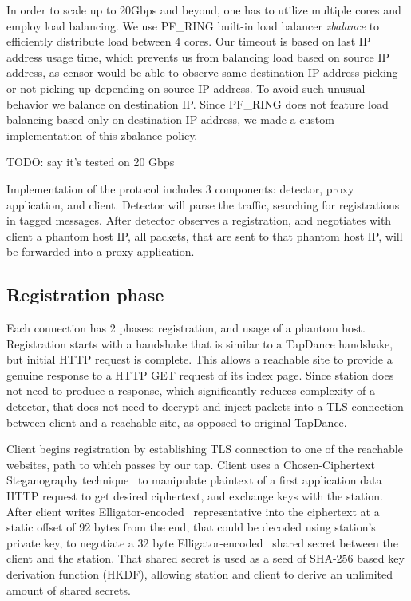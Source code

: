 \documentclass[sigconf,anonymous]{acmart}
\begin{document}
In order to scale up to 20Gbps and beyond,
one has to utilize multiple cores and employ load balancing.
We use PF\_RING built-in load balancer \emph{zbalance} to efficiently
distribute load between 4 cores.
Our timeout is based on last IP address usage time, which prevents us from
balancing load based on source IP address,
as censor would be able to observe
same destination IP address picking or not picking up
depending on source IP address.
To avoid such unusual behavior we balance on destination IP.
Since PF\_RING does not feature load balancing based only on destination
IP address, we made a custom implementation of this zbalance policy.

TODO: say it's tested on 20 Gbps

Implementation of the protocol includes 3 components:
detector, proxy application, and client.
Detector will parse the traffic, searching for registrations in
tagged messages. After detector observes a registration, and negotiates with client
a phantom host IP,
all packets, that are sent to that phantom host IP,
will be forwarded into a proxy application.

\subsection{Registration phase}

Each \scheme connection has 2 phases: registration, and usage of a phantom host.
Registration starts with a handshake that is similar to a TapDance handshake,
but initial HTTP request is complete.
This allows a reachable site to provide a genuine response
to a HTTP GET request of its index page.
Since station does not need to produce a response,
which significantly reduces complexity of a detector,
that does not need to decrypt and inject packets into a TLS connection between
client and a reachable site, as opposed to original TapDance.

Client begins registration by establishing TLS connection
to one of the reachable websites,
path to which passes by our tap.
Client uses a Chosen-Ciphertext Steganography technique~\cite{tapdance14} to manipulate
plaintext of a first application data HTTP request
to get desired ciphertext,
and exchange keys with the station.
After client writes Elligator-encoded~\cite{elligator} representative into the ciphertext at a static offset of 92 bytes from the end,
that could be decoded using station's private key,
to negotiate a 32 byte Elligator-encoded~\cite{elligator} shared secret between the client and the station.
That shared secret is used as a seed of SHA-256 based key derivation function (HKDF),
allowing station and client to derive an unlimited amount of shared secrets.
\end{document}
